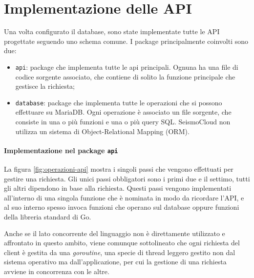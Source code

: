 \section{Implementazione delle API}

Una volta configurato il database, sono state implementate tutte le API progettate seguendo uno schema comune. I package principalmente coinvolti sono due:

\begin{itemize}
\item \texttt{api}: package che implementa tutte le api principali. Ognuna ha una file di codice sorgente associato, che contiene di solito la funzione principale che gestisce la richiesta;
\item \texttt{database}: package che implementa tutte le operazioni che si possono effettuare su MariaDB. Ogni operazione è associato un file sorgente, che consiste in una o più funzioni e una o più query SQL. SeismoCloud non utilizza un sistema di Object-Relational Mapping (ORM).
\end{itemize}

\paragraph{Implementazione nel package \texttt{api}} La figura \ref{fig:operazioni-api} mostra i singoli passi che vengono effettuati per gestire una richiesta. Gli unici passi obbligatori sono i primi due e il settimo, tutti gli altri dipendono in base alla richiesta. Questi passi vengono implementati all'interno di una singola funzione che è nominata in modo da ricordare l'API, e al suo interno spesso invoca funzioni che operano sul database oppure funzioni della libreria standard di Go.

Anche se il lato concorrente del linguaggio non è direttamente utilizzato e affrontato in questo ambito, viene comunque sottolineato che ogni richiesta del client è gestita da una \textit{goroutine}, una specie di thread leggero gestito non dal sistema operativo ma dall'applicazione, per cui la gestione di una richiesta avviene in concorrenza con le altre.


